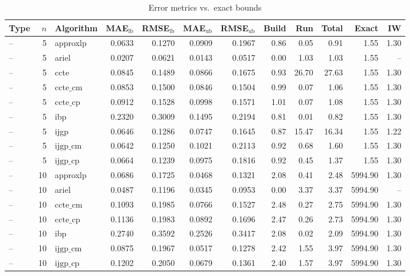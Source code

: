 \begin{table}[ht]
\centering
\scriptsize
\caption{Error metrics vs.\ exact bounds}
\begin{tabular}{lrlrrrrrrrrr}
\toprule
Type & $n$ & Algorithm & MAE$_{\text{lb}}$ & RMSE$_{\text{lb}}$ & MAE$_{\text{ub}}$ & RMSE$_{\text{ub}}$ & Build & Run & Total & Exact & IW \\
\midrule
-- & 5 & approxlp & 0.0633 & 0.1270 & 0.0909 & 0.1967 & 0.86 & 0.05 & 0.91 & 1.55 & 1.30 \\
-- & 5 & ariel & 0.0207 & 0.0621 & 0.0143 & 0.0517 & 0.00 & 1.03 & 1.03 & 1.55 & -- \\
-- & 5 & ccte & 0.0845 & 0.1489 & 0.0866 & 0.1675 & 0.93 & 26.70 & 27.63 & 1.55 & 1.30 \\
-- & 5 & $\text{ccte\_cm}$ & 0.0853 & 0.1500 & 0.0846 & 0.1504 & 0.99 & 0.07 & 1.06 & 1.55 & 1.30 \\
-- & 5 & $\text{ccte\_cp}$ & 0.0912 & 0.1528 & 0.0998 & 0.1571 & 1.01 & 0.07 & 1.08 & 1.55 & 1.30 \\
-- & 5 & ibp & 0.2320 & 0.3009 & 0.1495 & 0.2194 & 0.81 & 0.01 & 0.82 & 1.55 & 1.30 \\
-- & 5 & ijgp & 0.0646 & 0.1286 & 0.0747 & 0.1645 & 0.87 & 15.47 & 16.34 & 1.55 & 1.22 \\
-- & 5 & $\text{ijgp\_cm}$ & 0.0642 & 0.1250 & 0.1021 & 0.2113 & 0.92 & 0.68 & 1.60 & 1.55 & 1.30 \\
-- & 5 & $\text{ijgp\_cp}$ & 0.0664 & 0.1239 & 0.0975 & 0.1816 & 0.92 & 0.45 & 1.37 & 1.55 & 1.30 \\
-- & 10 & approxlp & 0.0686 & 0.1725 & 0.0468 & 0.1321 & 2.08 & 0.41 & 2.48 & 5994.90 & 1.30 \\
-- & 10 & ariel & 0.0487 & 0.1196 & 0.0345 & 0.0953 & 0.00 & 3.37 & 3.37 & 5994.90 & -- \\
-- & 10 & $\text{ccte\_cm}$ & 0.1093 & 0.1985 & 0.0766 & 0.1527 & 2.48 & 0.27 & 2.75 & 5994.90 & 1.30 \\
-- & 10 & $\text{ccte\_cp}$ & 0.1136 & 0.1983 & 0.0892 & 0.1696 & 2.47 & 0.26 & 2.73 & 5994.90 & 1.30 \\
-- & 10 & ibp & 0.2740 & 0.3592 & 0.2526 & 0.3417 & 2.08 & 0.02 & 2.09 & 5994.90 & 1.30 \\
-- & 10 & $\text{ijgp\_cm}$ & 0.0875 & 0.1967 & 0.0517 & 0.1278 & 2.42 & 1.55 & 3.97 & 5994.90 & 1.30 \\
-- & 10 & $\text{ijgp\_cp}$ & 0.1202 & 0.2050 & 0.0679 & 0.1361 & 2.40 & 1.57 & 3.97 & 5994.90 & 1.30 \\
\bottomrule
\end{tabular}
\end{table}
